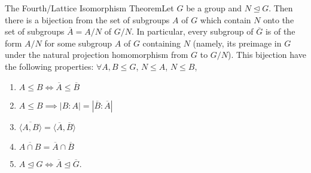 \documentclass{report}
\newcommand{\thm}[2]{\begin{Theorem}{#1}{}#2\end{Theorem}}
\begin{document}
\thm{The Fourth/Lattice Isomorphism Theorem}{Let $G$ be a group and $N \unlhd G$. Then there is a bijection from the set of subgroups $A$ of $G$ which contain $N$ onto the set of subgroups $\overline A = A/N$ of $G/N$. In particular, every subgroup of $\overline G$ is of the form $A/N$ for some subgroup $A$ of $G$ containing $N$ (namely, its preimage in $G$ under the natural projection homomorphism from $G$ to $G/N$). This bijection have the following properties: $\forall A, B \leq G$, $N \leq A$, $N \leq B$,
\begin{enumerate}
    \item $A \leq B \iff \overline A \leq \overline B$
    \item $A \leq B \implies |B:A| = |\overline B : \overline A|$
    \item $\overline{\langle A, B \rangle} = \langle \overline A , \overline B \rangle$
    \item $\overline{A \cap B} = \overline A \cap \overline B$
    \item $A \unlhd G \iff \overline A \unlhd \overline G$. 
\end{enumerate}}
\end{document}
